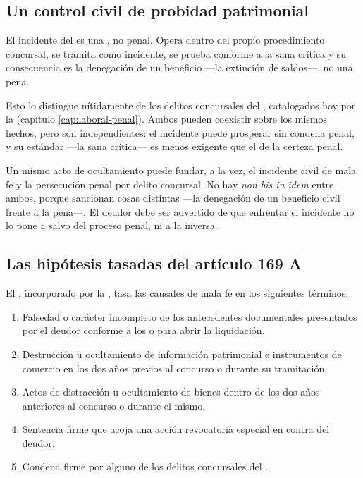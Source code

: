 \subsection{Un control civil de probidad patrimonial}

El incidente del  es una , no penal. Opera dentro del
propio procedimiento concursal, se tramita como incidente, se prueba conforme a la sana
crítica y su consecuencia es la denegación de un beneficio ---la extinción de saldos---, no una
pena.

Esto lo distingue nítidamente de los delitos concursales del \cpen{}, catalogados hoy por la
\Ldeleco{} \citeyearpar{ley-21595} (capítulo \ref{cap:laboral-penal}). Ambos pueden coexistir
sobre los mismos hechos, pero son independientes: el incidente puede prosperar sin condena
penal, y su estándar ---la sana crítica--- es menos exigente que el de la certeza penal.

\begin{alerta}
Un mismo acto de ocultamiento puede fundar, a la vez, el incidente civil de mala fe y la
persecución penal por delito concursal. No hay \emph{non bis in idem} entre ambos, porque
sancionan cosas distintas ---la denegación de un beneficio civil frente a la pena---. El deudor
debe ser advertido de que enfrentar el incidente no lo pone a salvo del proceso penal, ni a la
inversa.
\end{alerta}

\bloqueNormativo

\subsection{Las hipótesis tasadas del artículo 169 A}

El , incorporado por la \Lreforma{} \citeyearpar{ley-21563}, tasa las causales
de mala fe en los siguientes términos:

\begin{enumerate}
  \item Falsedad o carácter incompleto de los antecedentes documentales presentados por
  el deudor conforme a los  o  para abrir la liquidación.
  \item Destrucción u ocultamiento de información patrimonial e instrumentos de comercio
  en los dos años previos al concurso o durante su tramitación.
  \item Actos de distracción u ocultamiento de bienes dentro de los dos años anteriores
  al concurso o durante el mismo.
  \item Sentencia firme que acoja una acción revocatoria especial en contra del deudor.
  \item Condena firme por alguno de los delitos concursales del \cpen{}.
\end{enumerate}

